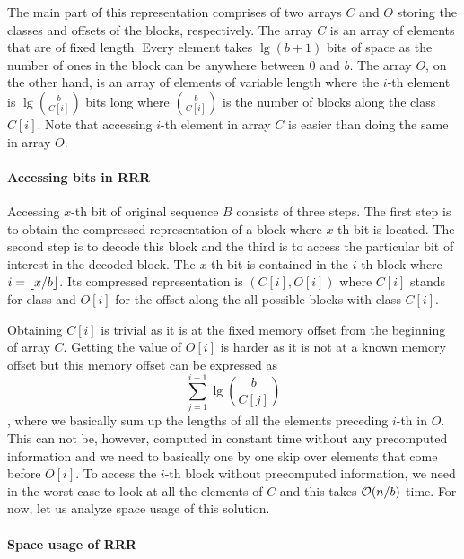 The main part of this representation comprises of two arrays $C$ and $O$ storing the classes and offsets of
the blocks, respectively. The array $C$ is an array of elements that are of fixed length. Every element takes
$\lg (b+1)$ bits of space as the number of ones in the block can be anywhere between 0 and $b$. The array $O$,
on the other hand, is an array of elements of variable length where the $i$-th element is $\lg {b\choose C[i]}$
bits long where ${b\choose C[i]}$ is the number of blocks along the class $C[i]$. Note that accessing $i$-th element
in array $C$ is easier than doing the same in array $O$.

\paragraph{Accessing bits in RRR}

Accessing $x$-th bit of original sequence $B$ consists of three steps. The first step is to obtain the
compressed representation of a block where $x$-th bit is located. The second step is to decode this block and
the third is to access the particular bit of interest in the decoded block. The $x$-th bit is contained in the
$i$-th block where $i=\left\lfloor x/b \right\rfloor$. Its compressed representation is $(C[i], O[i])$ where $C[i]$ stands for class
and $O[i]$ for the offset along the all possible blocks with class $C[i]$.

Obtaining $C[i]$ is trivial as it is at the fixed memory offset from the beginning of array $C$. Getting the
value of $O[i]$ is harder as it is not at a known memory offset but this memory offset can be expressed as
$$\sum_{j=1}^{i-1} \lg {b\choose C[j]}$$, where we basically sum up the lengths of all the elements preceding
$i$-th in $O$. This can not be, however, computed in constant time without any precomputed information and we
need to basically one by one skip over elements that come before $O[i]$. To access the $i$-th block without
precomputed information, we need in the worst case to look at all the elements of $C$ and this takes $\mathcal{O}(n/b)$
time. For now, let us analyze space usage of this solution.

\paragraph{Space usage of RRR}

